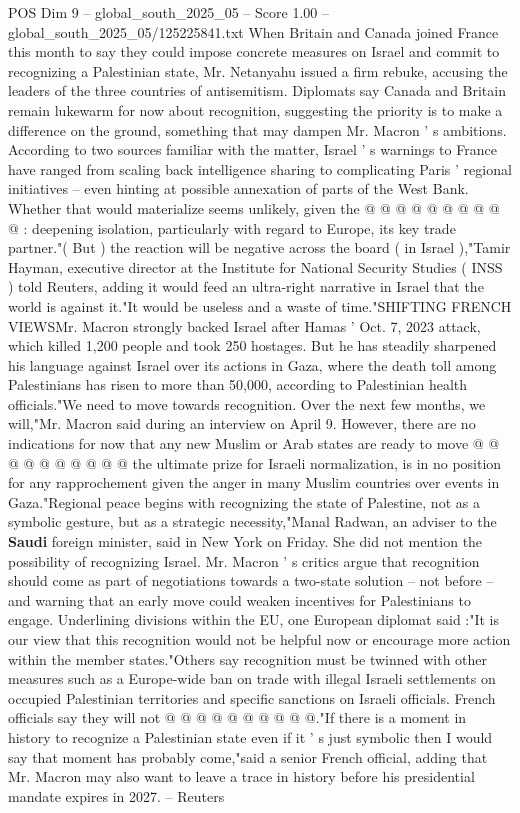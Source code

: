 \begin{textsample}{POS Dim 9 – global\_south\_2025\_05 – Score 1.00 – global\_south\_2025\_05/125225841.txt}
When Britain and Canada joined France this month to say they could impose concrete measures on Israel and commit to recognizing a Palestinian state, Mr.
Netanyahu issued a firm rebuke, accusing the leaders of the three countries of antisemitism.
Diplomats say Canada and Britain remain lukewarm for now about recognition, suggesting the priority is to make a difference on the ground, something that may dampen Mr.
Macron ' s ambitions.
According to two sources familiar with the matter, Israel ' s warnings to France have ranged from scaling back intelligence sharing to complicating Paris ' regional initiatives -- even hinting at possible annexation of parts of the West Bank.
Whether that would materialize seems unlikely, given the @ @ @ @ @ @ @ @ @ @ : deepening isolation, particularly with regard to Europe, its key trade partner."( But ) the reaction will be negative across the board ( in Israel ),"Tamir Hayman, executive director at the Institute for National Security Studies ( INSS ) told Reuters, adding it would feed an ultra-right narrative in Israel that the world is against it."It would be useless and a waste of time."SHIFTING FRENCH VIEWSMr.
Macron strongly backed Israel after Hamas ' Oct. 7, 2023 attack, which killed 1,200 people and took 250 hostages.
But he has steadily sharpened his language against Israel over its actions in Gaza, where the death toll among Palestinians has risen to more than 50,000, according to Palestinian health officials."We need to move towards recognition.
Over the next few months, we will,"Mr.
Macron said during an interview on April 9.
However, there are no indications for now that any new Muslim or Arab states are ready to move @ @ @ @ @ @ @ @ @ @ the ultimate prize for Israeli normalization, is in no position for any rapprochement given the anger in many Muslim countries over events in Gaza."Regional peace begins with recognizing the state of Palestine, not as a symbolic gesture, but as a strategic necessity,"Manal Radwan, an adviser to the \textbf{Saudi} foreign minister, said in New York on Friday.
She did not mention the possibility of recognizing Israel.
Mr.
Macron ' s critics argue that recognition should come as part of negotiations towards a two-state solution -- not before -- and warning that an early move could weaken incentives for Palestinians to engage.
Underlining divisions within the EU, one European diplomat said :"It is our view that this recognition would not be helpful now or encourage more action within the member states."Others say recognition must be twinned with other measures such as a Europe-wide ban on trade with illegal Israeli settlements on occupied Palestinian territories and specific sanctions on Israeli officials.
French officials say they will not @ @ @ @ @ @ @ @ @ @."If there is a moment in history to recognize a Palestinian state even if it ' s just symbolic then I would say that moment has probably come,"said a senior French official, adding that Mr.
Macron may also want to leave a trace in history before his presidential mandate expires in 2027. -- Reuters

\end{textsample}
